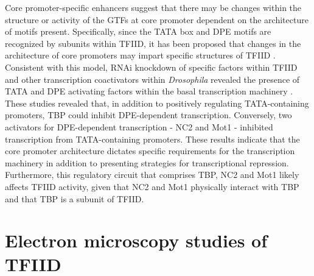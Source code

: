 \indent Core promoter-specific enhancers suggest that there may be changes within the structure or activity of the GTFs at core promoter dependent on the architecture of motifs present. Specifically, since the TATA box and DPE motifs are recognized by subunits within TFIID, it has been proposed that changes in the architecture of core promoters may impart specific structures of TFIID \cite{Ohtsuki_2485}. Consistent with this model, RNAi knockdown of specific factors within TFIID and other transcription coactivators within \emph{Drosophila} revealed the presence of TATA and DPE activating factors within the basal transcription machinery \cite{Hsu_811}. These studies revealed that, in addition to positively regulating TATA-containing promoters, TBP could inhibit DPE-dependent transcription.  Conversely, two activators for DPE-dependent transcription - NC2 and Mot1 - inhibited transcription from TATA-containing promoters. These results indicate that the core promoter architecture dictates specific requirements for the transcription machinery in addition to presenting strategies for transcriptional repression. Furthermore, this regulatory circuit that comprises TBP, NC2 and Mot1 likely affects TFIID activity, given that NC2 and Mot1 physically interact with TBP \cite{Kamada_1996,Darst_2003} and that TBP is a subunit of TFIID.  


\section{Electron microscopy studies of TFIID}

